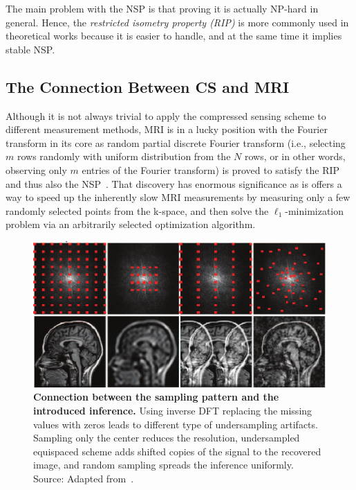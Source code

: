 \begin{remark}
The main problem with the NSP is that proving it is actually NP-hard in general. Hence, the \textit{restricted isometry property (RIP)} is more commonly used in theoretical works because it is easier to handle, and at the same time it implies stable NSP.
\end{remark}

\subsection{The Connection Between CS and MRI}
Although it is not always trivial to apply the compressed sensing scheme to different measurement methods, MRI is in a lucky position with the Fourier transform in its core as random partial discrete Fourier transform (i.e., selecting $m$ rows randomly with uniform distribution from the $N$ rows, or in other words, observing only $m$ entries of the Fourier transform) is proved to satisfy the RIP and thus also the NSP~\cite{fornasier_theoretical_2010}. That discovery has enormous significance as is offers a way to speed up the inherently slow MRI measurements by measuring only a few randomly selected points from the k-space, and then solve the $\ell_1$-minimization problem via an arbitrarily selected optimization algorithm.

\begin{figure}[tb]
    \centering
    \includegraphics[width=\linewidth]{images/random_sampling2.png}
    \caption{\textbf{Connection between the sampling pattern and the introduced inference.} Using inverse DFT replacing the missing values with zeros leads to different type of undersampling artifacts. Sampling only the center reduces the resolution, undersampled equispaced scheme adds shifted copies of the signal to the recovered image, and random sampling spreads the inference uniformly. Source: Adapted from~\cite{lustig_compressed_2008}.}
    \label{fig:random_sampling_images}
\end{figure}

